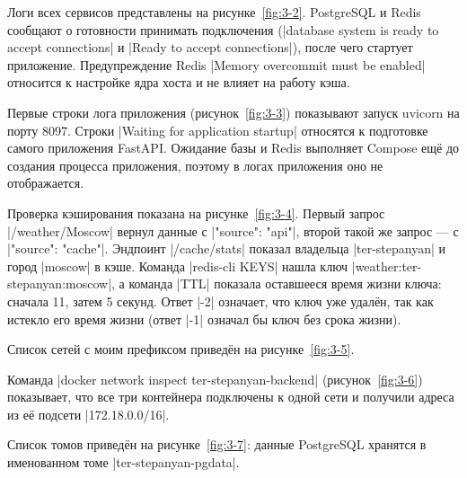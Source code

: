 
Логи всех сервисов представлены на рисунке~\ref{fig:3-2}. PostgreSQL и
Redis сообщают о готовности принимать подключения
(\cmd|database system is ready to accept connections| и
\cmd|Ready to accept connections|), после чего стартует приложение.
Предупреждение Redis \cmd|Memory overcommit must be enabled| относится
к настройке ядра хоста и не влияет на работу кэша.


Первые строки лога приложения (рисунок~\ref{fig:3-3}) показывают запуск
uvicorn на порту 8097. Строки \cmd|Waiting for application startup|
относятся к подготовке самого приложения FastAPI. Ожидание базы и Redis
выполняет Compose ещё до создания процесса приложения, поэтому в логах
приложения оно не отображается.


Проверка кэширования показана на рисунке~\ref{fig:3-4}. Первый запрос
\cmd|/weather/Moscow| вернул данные с \cmd|"source": "api"|, второй
такой же запрос --- с \cmd|"source": "cache"|. Эндпоинт
\cmd|/cache/stats| показал владельца \cmd|ter-stepanyan| и город
\cmd|moscow| в кэше. Команда \cmd|redis-cli KEYS| нашла ключ
\cmd|weather:ter-stepanyan:moscow|, а команда \cmd|TTL| показала
оставшееся время жизни ключа: сначала 11, затем 5 секунд. Ответ
\cmd|-2| означает, что ключ уже удалён, так как истекло его время
жизни (ответ \cmd|-1| означал бы ключ без срока жизни).


Список сетей с моим префиксом приведён на рисунке~\ref{fig:3-5}.


Команда \cmd|docker network inspect ter-stepanyan-backend|
(рисунок~\ref{fig:3-6}) показывает, что все три контейнера подключены к
одной сети и получили адреса из её подсети \cmd|172.18.0.0/16|.


Список томов приведён на рисунке~\ref{fig:3-7}: данные PostgreSQL
хранятся в именованном томе \cmd|ter-stepanyan-pgdata|.


